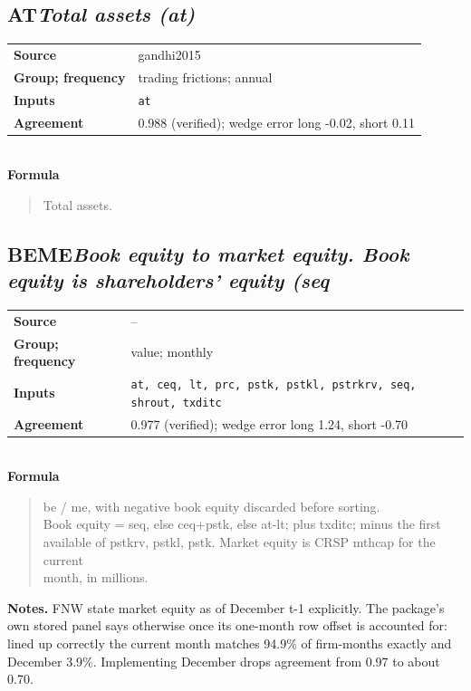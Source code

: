 \documentclass[11pt]{article}
\begin{document}
\subsection*{AT\quad\normalfont\itshape Total assets (at)}
\begin{tabular}{@{}p{3.3cm}p{12.3cm}@{}}
\textbf{Source} & gandhi2015\\
\textbf{Group; frequency} & trading frictions; annual\\
\textbf{Inputs} & \texttt{at}\\
\textbf{Agreement} & 0.988 (verified); wedge error long -0.02, short 0.11\\
\end{tabular}\\[4pt]
\textbf{Formula}
\begin{quote}\small
Total assets.\\

\end{quote}
\subsection*{BEME\quad\normalfont\itshape Book equity to market equity. Book equity is shareholders' equity (seq}
\begin{tabular}{@{}p{3.3cm}p{12.3cm}@{}}
\textbf{Source} & --\\
\textbf{Group; frequency} & value; monthly\\
\textbf{Inputs} & \texttt{at, ceq, lt, prc, pstk, pstkl, pstrkrv, seq, shrout, txditc}\\
\textbf{Agreement} & 0.977 (verified); wedge error long 1.24, short -0.70\\
\end{tabular}\\[4pt]
\textbf{Formula}
\begin{quote}\small
be / me, with negative book equity discarded before sorting.\\
Book equity = seq, else ceq+pstk, else at-lt; plus txditc; minus the first\\
available of pstkrv, pstkl, pstk. Market equity is CRSP mthcap for the current\\
month, in millions.\\

\end{quote}
\textbf{Notes.} FNW state market equity as of December t-1 explicitly. The package's own
stored panel says otherwise once its one-month row offset is accounted for:
lined up correctly the current month matches 94.9\% of firm-months exactly and
December 3.9\%. Implementing December drops agreement from 0.97 to about 0.70.
\end{document}
